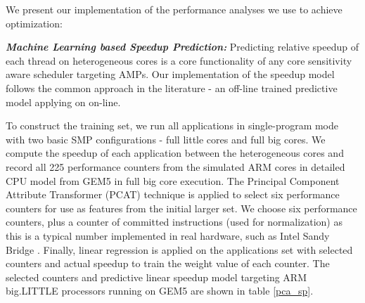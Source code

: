 \documentclass[10pt,conference]{IEEEtran}
\begin{document}
We present our implementation of the performance analyses we use to achieve optimization:

\textbf{\textit{Machine Learning based Speedup Prediction:}} Predicting relative speedup of each thread on heterogeneous cores is a core functionality of any core sensitivity aware scheduler targeting AMPs. Our implementation of the speedup model follows the common approach in the literature \cite{van2013fairness,jibaja2016portable,saez2012leveraging}- an off-line trained predictive model applying on on-line. 

To construct the training set, we run all applications in single-program mode with two basic SMP configurations - full little cores and full big cores. We compute the speedup of each application between the heterogeneous cores and record all 225 performance counters from the simulated ARM cores in detailed CPU model from GEM5 \cite{binkert2011gem5} in full big core execution. The Principal Component Attribute Transformer (PCAT) technique \cite{witten2016data} is applied to select six performance counters for use as features from the initial larger set. We choose six performance counters, plus a counter of committed instructions (used for normalization) as this is a typical number implemented in real hardware, such as Intel Sandy Bridge \cite{jibaja2016portable}. Finally, linear regression is applied on the applications set with selected counters and actual speedup to train the weight value of each counter. The selected counters and predictive linear speedup model targeting ARM big.LITTLE processors running on GEM5 are shown in table \ref{pca_sp}.  
\end{document}
